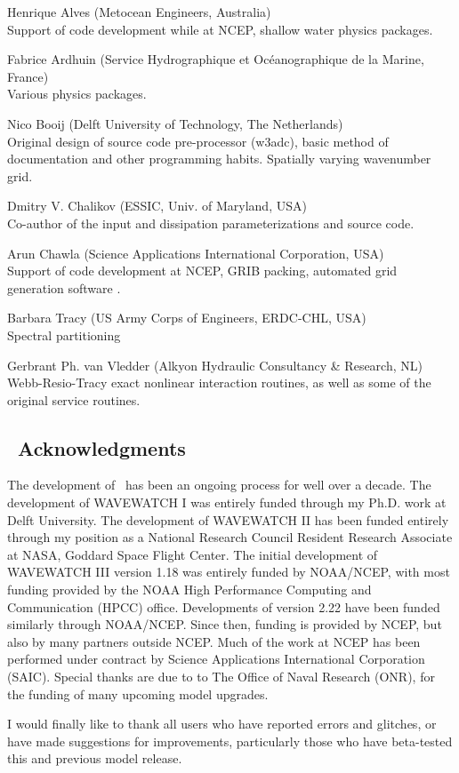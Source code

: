 \begin{list}{\ldots}{ }
\item [Henrique Alves] (Metocean Engineers, Australia) \\
Support of code development while at NCEP, shallow water physics packages.
\item [Fabrice Ardhuin] (Service Hydrographique et Oc\'{e}anographique de la
Marine, France) \\
Various  physics packages.
\item [Nico Booij] (Delft University of Technology, The Netherlands) \\
Original design of source code pre-processor ({\code w3adc}), basic method of
documentation and other programming habits. Spatially varying wavenumber grid.
\item [Dmitry V. Chalikov] (ESSIC, Univ. of Maryland, USA) \\ Co-author of the
\cite{tol:JPO96} input and dissipation parameterizations and source code.
\item [Arun Chawla](Science Applications International Corporation, USA) \\
Support of code development at NCEP, GRIB packing, automated grid generation
software \citep{tol:MMAB07a, tol:OMOD08a}.
\item [Barbara Tracy] (US Army Corps of Engineers, ERDC-CHL, USA) \\
Spectral partitioning
\item [Gerbrant Ph. van Vledder] (Alkyon Hydraulic Consultancy \& Research,
NL) \\ 
Webb-Resio-Tracy exact nonlinear interaction routines, as well as some of the
original service routines.
\end{list}


\vssub
\subsection{~Acknowledgments}
\vssub

The development of \ww\ has been an ongoing process for well over a
decade. The development of WAVEWATCH I was entirely funded through my
Ph.D. work at Delft University. The development of WAVEWATCH II has been
funded entirely through my position as a National Research Council Resident
Research Associate at NASA, Goddard Space Flight Center. The initial
development of WAVEWATCH III version 1.18 was entirely funded by NOAA/NCEP,
with most funding provided by the NOAA High Performance Computing and
Communication (HPCC) office. Developments of version 2.22 have been funded
similarly through NOAA/NCEP. Since then, funding is provided by NCEP, but also
by many partners outside NCEP. Much of the work at NCEP has been performed
under contract by Science Applications International Corporation (SAIC).
Special thanks are due to to The Office of Naval Research (ONR), for the
funding of many upcoming model upgrades.

I would finally like to thank all users who have reported errors and glitches,
or have made suggestions for improvements, particularly those who have
beta-tested this and previous model release.

